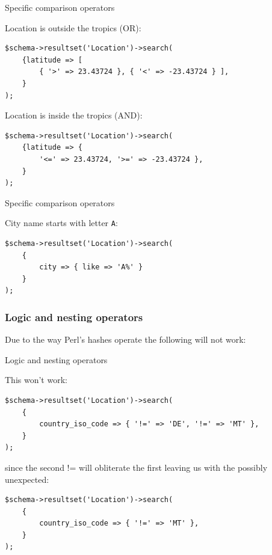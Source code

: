 \begin{frame}[fragile]{Specific comparison operators}

Location is outside the tropics (OR):

\begin{lstlisting}
$schema->resultset('Location')->search(
    {latitude => [ 
        { '>' => 23.43724 }, { '<' => -23.43724 } ],
    }
);
\end{lstlisting}

Location is inside the tropics (AND):

\begin{lstlisting}
$schema->resultset('Location')->search(
    {latitude => { 
        '<=' => 23.43724, '>=' => -23.43724 },
    }
);
\end{lstlisting}
\end{frame}

\begin{frame}[fragile]{Specific comparison operators}

City name starts with letter \verb|A|:

\begin{lstlisting}
$schema->resultset('Location')->search(
    {
        city => { like => 'A%' }
    }
);
\end{lstlisting}
\end{frame}

\subsubsection{Logic and nesting operators}

Due to the way Perl's hashes operate the following will not work:

\begin{frame}[fragile]{Logic and nesting operators}

This won't work:

\begin{lstlisting}
$schema->resultset('Location')->search(
    {
        country_iso_code => { '!=' => 'DE', '!=' => 'MT' },
    }
);
\end{lstlisting}

since the second != will obliterate the first leaving us with the possibly
unexpected:

\begin{lstlisting}
$schema->resultset('Location')->search(
    {
        country_iso_code => { '!=' => 'MT' },
    }
);
\end{lstlisting}
\end{frame}

